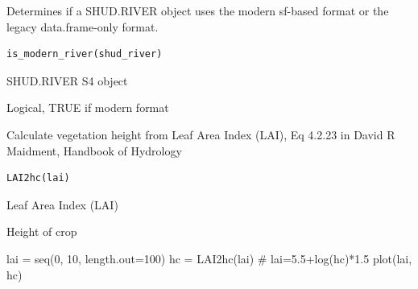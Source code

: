 \documentclass[a4paper]{book}
\begin{document}
%
\begin{Description}\relax
Determines if a SHUD.RIVER object uses the modern sf-based format
or the legacy data.frame-only format.
\end{Description}
%
\begin{Usage}
\begin{verbatim}
is_modern_river(shud_river)
\end{verbatim}
\end{Usage}
%
\begin{Arguments}
\begin{ldescription}
\item[\code{shud\_river}] SHUD.RIVER S4 object
\end{ldescription}
\end{Arguments}
%
\begin{Value}
Logical, TRUE if modern format
\end{Value}
%
\begin{Description}\relax
Calculate vegetation height from Leaf Area Index (LAI), Eq 4.2.23 in David R Maidment, Handbook of Hydrology
\end{Description}
%
\begin{Usage}
\begin{verbatim}
LAI2hc(lai)
\end{verbatim}
\end{Usage}
%
\begin{Arguments}
\begin{ldescription}
\item[\code{lai}] Leaf Area Index (LAI) 
\end{ldescription}
\end{Arguments}
%
\begin{Value}
Height of crop 
\end{Value}
%
\begin{Examples}
\begin{ExampleCode}
lai = seq(0, 10, length.out=100)
hc = LAI2hc(lai)
# lai=5.5+log(hc)*1.5
plot(lai, hc)
\end{ExampleCode}
\end{Examples}
\end{document}
